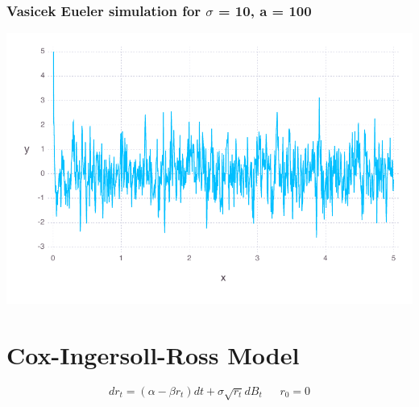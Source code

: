 \documentclass[a4paper,12pt]{article}
\begin{document}
\subsubsection{Vasicek Eueler simulation for $\sigma$ = 10, a = 100}
\includegraphics[width=\linewidth]{figures/problemset_7_1.pdf}



\section{Cox-Ingersoll-Ross Model}
$$
dr_t = (\alpha - \beta r_t)dt + \sigma \sqrt{r_t}dB_t \ \ \ \ \ \ \ r_0 = 0
$$
\end{document}
